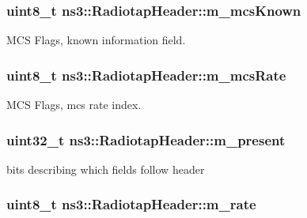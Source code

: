 \subsubsection[{\texorpdfstring{m\+\_\+mcs\+Known}{m_mcsKnown}}]{\setlength{\rightskip}{0pt plus 5cm}uint8\+\_\+t ns3\+::\+Radiotap\+Header\+::m\+\_\+mcs\+Known\hspace{0.3cm}{\ttfamily [private]}}\hypertarget{classns3_1_1RadiotapHeader_a2e855f91745b563d56c121a0c493950f}{}\label{classns3_1_1RadiotapHeader_a2e855f91745b563d56c121a0c493950f}


M\+CS Flags, known information field. 

\subsubsection[{\texorpdfstring{m\+\_\+mcs\+Rate}{m_mcsRate}}]{\setlength{\rightskip}{0pt plus 5cm}uint8\+\_\+t ns3\+::\+Radiotap\+Header\+::m\+\_\+mcs\+Rate\hspace{0.3cm}{\ttfamily [private]}}\hypertarget{classns3_1_1RadiotapHeader_a10f2171a51d9d199917fb066d0d7aa74}{}\label{classns3_1_1RadiotapHeader_a10f2171a51d9d199917fb066d0d7aa74}


M\+CS Flags, mcs rate index. 

\subsubsection[{\texorpdfstring{m\+\_\+present}{m_present}}]{\setlength{\rightskip}{0pt plus 5cm}uint32\+\_\+t ns3\+::\+Radiotap\+Header\+::m\+\_\+present\hspace{0.3cm}{\ttfamily [private]}}\hypertarget{classns3_1_1RadiotapHeader_a8b8aca212245ad4ad1aa796d4cc802bb}{}\label{classns3_1_1RadiotapHeader_a8b8aca212245ad4ad1aa796d4cc802bb}


bits describing which fields follow header 

\subsubsection[{\texorpdfstring{m\+\_\+rate}{m_rate}}]{\setlength{\rightskip}{0pt plus 5cm}uint8\+\_\+t ns3\+::\+Radiotap\+Header\+::m\+\_\+rate\hspace{0.3cm}{\ttfamily [private]}}\hypertarget{classns3_1_1RadiotapHeader_a07b97baa588eecf49cc0da352daa85d3}{}\label{classns3_1_1RadiotapHeader_a07b97baa588eecf49cc0da352daa85d3}


